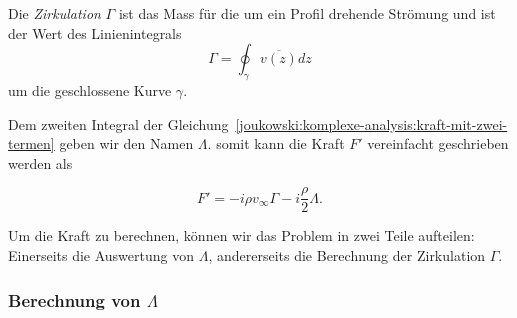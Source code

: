\begin{definition}[Zirkulation]
	\label{joukowski:komplexe-analysis:def:zirkulation}
	Die \emph{Zirkulation} $\Gamma$ ist das Mass für die um ein Profil drehende Strömung 
	und ist der Wert des Linienintegrals
	\[
		\Gamma
		=
		\displaystyle\oint_{\gamma} \overline{v(z)}
		dz
	\]
	um die geschlossene Kurve $\gamma$.
\end{definition}

Dem zweiten Integral der Gleichung~\eqref{joukowski:komplexe-analysis:kraft-mit-zwei-termen} geben wir den Namen $\Lambda$.
somit kann die Kraft $F'$ vereinfacht geschrieben werden als

\begin{equation}
	F'
	=
	-i \rho v_\infty \Gamma - i \frac{\rho}{2} \Lambda.
	\label{joukowski:komplexe-analysis:kraft-mit-lambda}
\end{equation}

Um die Kraft zu berechnen, können wir das Problem in zwei Teile aufteilen:
Einerseits die Auswertung von $\Lambda$,
andererseits die Berechnung der Zirkulation $\Gamma$.

\subsubsection{Berechnung von $\Lambda$}
\label{joukowski:komplexe-analysis:berechnung-von-lambda}

